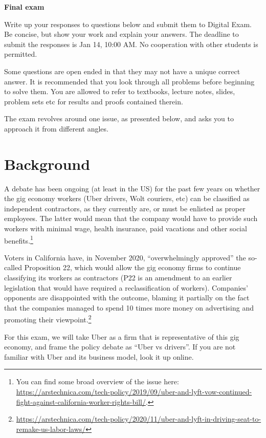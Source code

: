 \documentclass[a4paper]{article}
\newif\ifsolutions
\begin{document}
{\ifsolutions \else	
	
\fi}

\begin{center}
		\LARGE\textbf{Final exam {\ifsolutions solutions \fi}}
\end{center}

Write up your responses to questions below and submit them to Digital Exam. Be concise, but show your work and explain your answers. The deadline to submit the responses is Jan 14, 10:00 AM. No cooperation with other students is permitted.

Some questions are open ended in that they may not have a unique correct answer. It is recommended that you look through all problems before beginning to solve them. You are allowed to refer to textbooks, lecture notes, slides, problem sets etc for results and proofs contained therein.

The exam revolves around one issue, as presented below, and asks you to approach it from different angles.

\section*{Background}
	
	A debate has been ongoing (at least in the US) for the past few years on whether the gig economy workers (Uber drivers, Wolt couriers, etc) can be classified as independent contractors, as they currently are, or must be enlisted as proper employees. The latter would mean that the company would have to provide such workers with minimal wage, health insurance, paid vacations and other social benefits.\footnote{You can find some broad overview of the issue here: \url{https://arstechnica.com/tech-policy/2019/09/uber-and-lyft-vow-continued-fight-against-california-worker-rights-bill/}.}
	
	Voters in California have, in November 2020, ``overwhelmingly approved'' the so-called Proposition 22, which would allow the gig economy firms to continue classifying its workers as contractors (P22 is an amendment to an earlier legislation that would have required a reclassification of workers). Companies' opponents are disappointed with the outcome, blaming it partially on the fact that the companies managed to spend 10 times more money on advertising and promoting their viewpoint.\footnote{\url{https://arstechnica.com/tech-policy/2020/11/uber-and-lyft-in-driving-seat-to-remake-us-labor-laws/}} 
	
	For this exam, we will take Uber as a firm that is representative of this gig economy, and frame the policy debate as ``Uber vs drivers''. If you are not familiar with Uber and its business model, look it up online.
	
\end{document}
